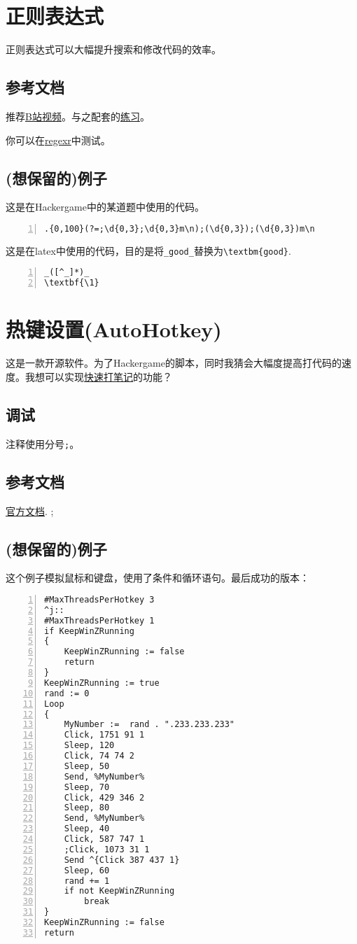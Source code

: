 \documentclass[11pt]{amsart}
\begin{document}
\section{正则表达式}
正则表达式可以大幅提升搜索和修改代码的效率。

\subsection{参考文档}
推荐\href{https://www.bilibili.com/video/BV19t4y1y7qP}{B站视频}。与之配套的\href{https://codejiaonang.com/#/course/regex_chapter1/}{练习}。

你可以在\href{https://regexr-cn.com/}{regexr}中测试。

\subsection{(想保留的)例子}
这是在Hackergame中的某道题中使用的代码。
\begin{lstlisting}[numbers=left,numberstyle=\tiny,numbersep=10pt]
.{0,100}(?=;\d{0,3};\d{0,3}m\n);(\d{0,3});(\d{0,3})m\n
\end{lstlisting}
这是在latex中使用的代码，目的是将\lstinline|_good_|替换为\lstinline|\textbm{good}|.
\begin{lstlisting}[numbers=left,numberstyle=\tiny,numbersep=10pt]
_([^_]*)_
\textbf{\1}
\end{lstlisting}

\section{热键设置(AutoHotkey)}
这是一款开源软件。为了Hackergame的脚本，同时我猜会大幅度提高打代码的速度。我想可以实现\href{https://zhuanlan.zhihu.com/p/60049290}{快速打笔记}的功能？
\subsection{调试}

注释使用分号\lstinline|;|。

\subsection{参考文档}
\href{https://wyagd001.github.io/zh-cn/docs/AutoHotkey.htm}{官方文档}.
;
\subsection{(想保留的)例子}
这个例子模拟鼠标和键盘，使用了条件和循环语句。最后成功的版本：
\begin{lstlisting}[numbers=left,numberstyle=\tiny,numbersep=10pt]
#MaxThreadsPerHotkey 3
^j::  
#MaxThreadsPerHotkey 1
if KeepWinZRunning  
{
    KeepWinZRunning := false  
    return  
}
KeepWinZRunning := true
rand := 0
Loop
{
    MyNumber :=  rand . ".233.233.233"
	Click, 1751 91 1
	Sleep, 120
	Click, 74 74 2
	Sleep, 50	
	Send, %MyNumber%
	Sleep, 70	
	Click, 429 346 2
	Sleep, 80
	Send, %MyNumber%
	Sleep, 40
	Click, 587 747 1
	;Click, 1073 31 1
	Send ^{Click 387 437 1}
	Sleep, 60	
	rand += 1
    if not KeepWinZRunning  
        break  
}
KeepWinZRunning := false  
return
\end{lstlisting}
\end{document}

